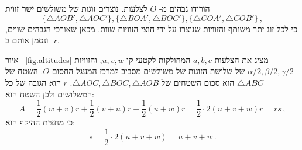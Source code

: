\documentclass[12pt,a4paper]{article}
\begin{document}
הורידו גבהים מ-%
$O$
לצלעות. נוצרים זוגות של משולשים 
\textbf{ישר זווית}
\[\{\triangle AOB', \triangle AOC'\}, \{\triangle BOA', \triangle BOC'\}, \{\triangle COA', \triangle COB'\}\,,
\]
כי לכל זוג יתר משותף והזוויות שנוצרו על ידי חוצי הזוויות שוות. מכאן שאורכי הגבהים שווים, ונסמן אותם ב-%
$r$.

איור%
~\ref{fig.altitudes}
מציג את הצלעות
$a,b,c$
המחולקות לקטעי קו
$u,v,w$,
והזוויות
$\alpha/2,\beta/2,\gamma/2$
של שלושת הזוגות של משולשים מסביב למרכז המעגל החסום
$O$.
השטח של 
$\triangle ABC$
הוא סכום השטחים של 
$\triangle AOC, \triangle BOC, \triangle AOB$. $r$
הוא הגובה של כל המשלושים ולכן השטח הוא:
\begin{equation}
A = \frac{1}{2}(w+v)r + \frac{1}{2}(v+u)r + \frac{1}{2}(u+w)r = \frac{1}{2}\cdot 2(u+v+w)r = rs\,, \label{eq.area1}
\end{equation}
כי מחצית ההיקף הוא:
\begin{equation}
s=\frac{1}{2}\cdot 2 (u+v+w)=u+v+w\,.\label{eq.semi}
\end{equation}

\vspace*{-8ex}
\end{document}
